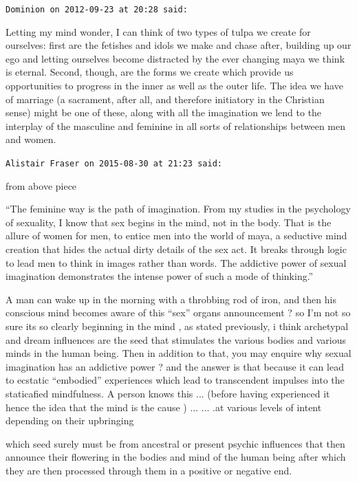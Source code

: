 \begin{footnotesize}
\begin{sffamily}
\texttt{Dominion on 2012-09-23 at 20:28 said:}

Letting my mind wonder, I can think of two types of tulpa we create for ourselves: first are the fetishes and idols we make and chase after, building up our ego and letting ourselves become distracted by the ever changing maya we think is eternal. Second, though, are the forms we create which provide us opportunities to progress in the inner as well as the outer life. The idea we have of marriage (a sacrament, after all, and therefore initiatory in the Christian sense) might be one of these, along with all the imagination we lend to the interplay of the masculine and feminine in all sorts of relationships between men and women.

\hfill

\texttt{Alistair Fraser on 2015-08-30 at 21:23 said:}

from above piece

``The feminine way is the path of imagination. From my studies in the psychology of sexuality, I know that sex begins in the mind, not in the body. That is the allure of women for men, to entice men into the world of maya, a seductive mind creation that hides the actual dirty details of the sex act. It breaks through logic to lead men to think in images rather than words. The addictive power of sexual imagination demonstrates the intense power of such a mode of thinking.''

A man can wake up in the morning with a throbbing rod of iron, and then his conscious mind becomes aware of this ``sex'' organs announcement ? so I'm not so sure its so clearly beginning in the mind , as stated previously, i think archetypal and dream influences are the seed that stimulates the various bodies and various minds in the human being. Then in addition to that, you may enquire why sexual imagination has an addictive power ? and the answer is that because it can lead to ecstatic ``embodied'' experiences which lead to transcendent impulses into the staticafied mindfulness. A person knows this ... (before having experienced it hence the idea that the mind is the cause )
... ... .at various levels of intent depending on their upbringing

which seed surely must be from ancestral or present psychic influences that then announce their flowering in the bodies and mind of the human being after which they are then processed through them in a positive or negative end.


\end{sffamily}
\end{footnotesize}
